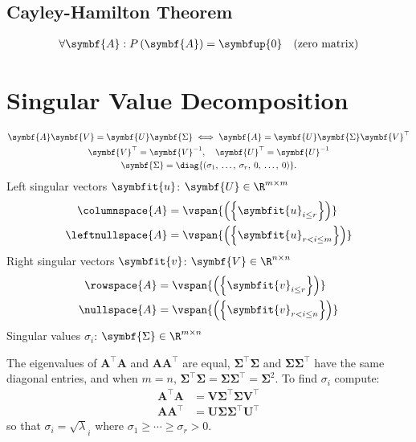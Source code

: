 \documentclass{article}
\begin{document}
\begin{multicols*}{3}
    \subsection{Cayley-Hamilton Theorem}
    \begin{align*}
        \forall \symbf{A} : P\left( \symbf{A} \right) = \symbfup{0} &  & \text{(zero matrix)}
    \end{align*}
    \section{Singular Value Decomposition}
    \begin{gather*}
        \symbf{A} \symbf{V} = \symbf{U} \symbf{\Sigma}
        \iff
        \symbf{A} = \symbf{U} \symbf{\Sigma} \symbf{V}^\top                                        \\
        \symbf{V}^\top = \symbf{V}^{-1}, \quad \symbf{U}^\top = \symbf{U}^{-1}                                                          \\
        \symbf{\Sigma} = \diag{\left( \sigma_1,\: \dots,\: \sigma_r,\: 0,\: \dots,\: 0 \right)}.
    \end{gather*}
    Left singular vectors \(\symbfit{u}\): \(\symbf{U} \in \R^{m \times m}\)
    \begin{align*}
        \columnspace{A}   & = \vspan{\left( \left\{ \symbfit{u}_{i \leq r} \right\} \right)}     \\
        \leftnullspace{A} & = \vspan{\left( \left\{ \symbfit{u}_{r < i \leq m} \right\} \right)}
    \end{align*}
    Right singular vectors \(\symbfit{v}\): \(\symbf{V} \in  \R^{n \times n}\)
    \begin{align*}
        \rowspace{A}  & = \vspan{\left( \left\{ \symbfit{v}_{i \leq r} \right\} \right)}     \\
        \nullspace{A} & = \vspan{\left( \left\{ \symbfit{v}_{r < i \leq n} \right\} \right)}
    \end{align*}
    Singular values \(\sigma_i\): \(\symbf{\Sigma} \in \R^{m \times n}\)

    The eigenvalues of \(\symbf{A}^\top\symbf{A}\) and \(\symbf{A}\symbf{A}^\top\)
    are equal, \(\symbf{\Sigma}^\top \symbf{\Sigma}\) and \(\symbf{\Sigma} \symbf{\Sigma}^\top\) have the same diagonal entries, and
    when \(m = n\), \(\symbf{\Sigma}^\top\symbf{\Sigma} = \symbf{\Sigma} \symbf{\Sigma}^\top = \symbf{\Sigma}^2\).
    To find \(\sigma_i\) compute:
    \begin{align*}
        \symbf{A}^\top \symbf{A} & = \symbf{V} \symbf{\Sigma}^\top \symbf{\Sigma} \symbf{V}^\top \\
        \symbf{A} \symbf{A}^\top & = \symbf{U} \symbf{\Sigma} \symbf{\Sigma}^\top \symbf{U}^\top
    \end{align*}
    so that \(\sigma_i = \sqrt{\lambda}_i\) where \(\sigma_1 \geq \cdots \geq \sigma_r > 0\).

\end{multicols*}
\end{document}

